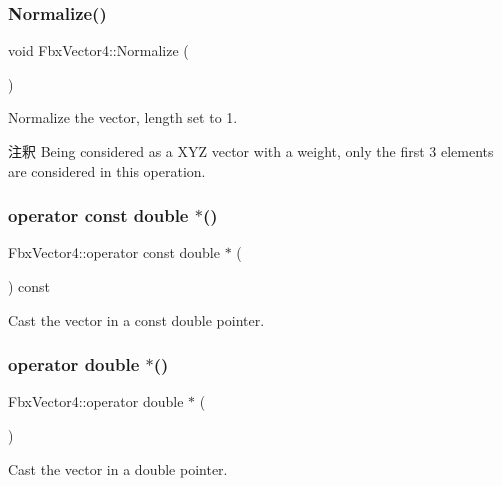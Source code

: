 \subsubsection{\texorpdfstring{Normalize()}{Normalize()}}
{\footnotesize\ttfamily void Fbx\+Vector4\+::\+Normalize (\begin{DoxyParamCaption}{ }\end{DoxyParamCaption})}

Normalize the vector, length set to 1. \begin{DoxyRemark}{注釈}
Being considered as a X\+YZ vector with a weight, only the first 3 elements are considered in this operation. 
\end{DoxyRemark}
\mbox{\label{class_fbx_vector4_a9be3dde6c582dc5b74f315fa7b6b941f}} 
\subsubsection{\texorpdfstring{operator const double $\ast$()}{operator const double *()}}
{\footnotesize\ttfamily Fbx\+Vector4\+::operator const double $\ast$ (\begin{DoxyParamCaption}{ }\end{DoxyParamCaption}) const}



Cast the vector in a const double pointer. 

\mbox{\label{class_fbx_vector4_aa8d485453c0a2b9160eff2fb2c6c6a02}} 
\subsubsection{\texorpdfstring{operator double $\ast$()}{operator double *()}}
{\footnotesize\ttfamily Fbx\+Vector4\+::operator double $\ast$ (\begin{DoxyParamCaption}{ }\end{DoxyParamCaption})}



Cast the vector in a double pointer. 

\mbox{\label{class_fbx_vector4_ab45035f8dd5def6b990e6e21c4f1e36d}} 
